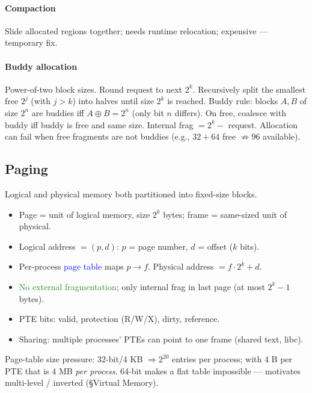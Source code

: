 \paragraph{Compaction} Slide allocated regions together; needs runtime relocation; expensive — temporary fix.
\paragraph{Buddy allocation}
Power-of-two block sizes. Round request to next $2^k$. Recursively split the smallest free $2^j$ (with $j>k$) into halves until size $2^k$ is reached.
\textcolor{Bittersweet}{Buddy rule}: blocks $A,B$ of size $2^n$ are buddies iff $A \oplus B = 2^n$ (only bit $n$ differs).
On free, coalesce with buddy iff buddy is free and same size.
\textcolor{Bittersweet}{Internal frag} $= 2^k - $ request. Allocation can fail when free fragments are not buddies (e.g., $32+64$ free $\not\Rightarrow 96$ available).

\subsection{Paging}
Logical and physical memory both partitioned into fixed-size blocks.
\begin{itemize}
  \item \textcolor{Bittersweet}{Page} = unit of logical memory, size $2^k$ bytes; \textcolor{Bittersweet}{frame} = same-sized unit of physical.
  \item Logical address $=(p, d)$: $p$ = page number, $d$ = offset ($k$ bits).
  \item Per-process \textcolor{Blue}{page table} maps $p \to f$. Physical address $= f\cdot 2^k + d$.
  \item \textcolor{ForestGreen}{No external fragmentation}; only internal frag in last page (at most $2^k-1$ bytes).
  \item \textcolor{Bittersweet}{PTE bits}: valid, protection (R/W/X), dirty, reference.
  \item \textcolor{Bittersweet}{Sharing}: multiple processes' PTEs can point to one frame (shared text, libc).
\end{itemize}
\textcolor{Bittersweet}{Page-table size pressure}: 32-bit/4 KB $\Rightarrow 2^{20}$ entries per process; with 4 B per PTE that is 4 MB \emph{per process}. 64-bit makes a flat table impossible — motivates multi-level / inverted (§Virtual Memory).

